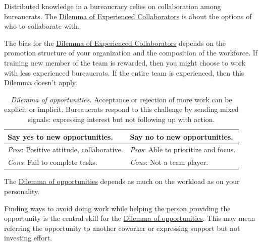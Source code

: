Distributed knowledge in a bureaucracy relies on collaboration among bureaucrats. 
The \href{table:experience}{Dilemma of Experienced Collaborators} is about the options of who to collaborate with. 


The bias for the \href{table:experience}{Dilemma of Experienced Collaborators} depends on the promotion structure of your organization and the composition of the workforce. If training new member of the team is rewarded, then you might choose to work with less experienced bureaucrats. If the entire team is experienced, then this Dilemma doesn't apply.

\begin{center}
\begin{table}[H] %
\begin{tabular}{ | m{\dilemmatablewidth}| m{\dilemmatablewidth} | } 
  \hline
  \textbf{Say yes to new opportunities.} & 
  \textbf{Say no to new opportunities.} \\ 
  \hline
  \textit{Pros}: Positive attitude, collaborative. &
  \textit{Pros}: Able to prioritize and focus. \\
  \hline
  \textit{Cons}: Fail to complete tasks. &
  \textit{Cons}: Not a team player. \\  
  \hline
\end{tabular}
\caption{
\textit{Dilemma of opportunities.}
Acceptance or rejection of more work can be explicit or implicit. Bureaucrats respond to this challenge by sending mixed signals: expressing interest but not following up with action.
}
\label{table:new-opportunties}
\end{table}
\end{center}

The \href{table:new-opportunties}{Dilemma of opportunities} depends as much on the workload as on your personality. 

Finding ways to avoid doing work while helping the person providing the opportunity is the central skill for the \href{table:new-opportunties}{Dilemma of opportunities}. This may mean referring the opportunity to another coworker or expressing support but not investing effort. 

